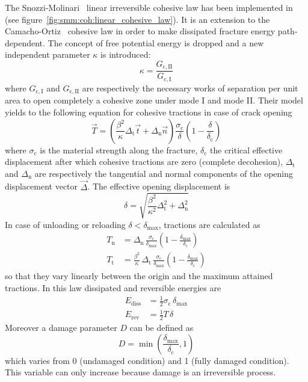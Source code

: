 The Snozzi-Molinari~\cite{snozzi_cohesive_2013} linear irreversible
cohesive law has been implemented in \akantu (see
figure~\ref{fig:smm:coh:linear_cohesive_law}). It is an extension to
the Camacho-Ortiz~\cite{camacho_computational_1996} cohesive law in
order to make dissipated fracture energy path-dependent. The concept
of free potential energy is dropped and a new independent parameter
$\kappa$ is introduced:
\begin{equation}
  \kappa = \frac{G_\mathrm{c, II}}{G_\mathrm{c, I}}
\end{equation}
where $G_\mathrm{c, I}$ and $G_\mathrm{c, II}$ are respectively the
necessary works of separation per unit area to open completely a
cohesive zone under mode I and mode II. Their model yields to the
following equation for cohesive tractions in case of crack opening
\begin{equation}
  \label{eq:smm:coh:tractions}
  \vec{T} = \left( \frac{\beta^2}{\kappa} \Delta_\mathrm{t} \vec{t} +
    \Delta_\mathrm{n} \vec{n} \right)
  \frac{\sigma_\mathrm{c}}{\delta}
  \left( 1- \frac{\delta}{\delta_\mathrm{c}} \right)
\end{equation}
where $\sigma_\mathrm{c}$ is the material strength along the fracture,
$\delta_\mathrm{c}$ the critical effective displacement after which
cohesive tractions are zero (complete decohesion), $\Delta_\mathrm{t}$
and $\Delta_\mathrm{n}$ are respectively the tangential and normal
components of the opening displacement vector $\vec{\Delta}$. The
effective opening displacement is
\begin{equation}
  \delta = \sqrt{\frac{\beta^2}{\kappa^2} \Delta_\mathrm{t}^2 +
    \Delta_\mathrm{n}^2}
\end{equation}
In case of unloading or reloading $\delta < \delta_\mathrm{max}$,
tractions are calculated as
\begin{align}
  T_\mathrm{n} &= \Delta_\mathrm{n}\,
  \frac{\sigma_\mathrm{c}}{\delta_\mathrm{max}}
  \left( 1- \frac{\delta_\mathrm{max}}{\delta_\mathrm{c}} \right) \\
  T_\mathrm{t} &= \frac{\beta^2}{\kappa}\, \Delta_\mathrm{t}\,
  \frac{\sigma_\mathrm{c}}{\delta_\mathrm{max}}
  \left( 1- \frac{\delta_\mathrm{max}}{\delta_\mathrm{c}} \right)
\end{align}
so that they vary linearly between the origin and the maximum attained
tractions. In this law dissipated and reversible energies are
\begin{align}
  E_\mathrm{diss} &= \frac{1}{2} \sigma_\mathrm{c}\, \delta_\mathrm{max}\\[1ex]
  E_\mathrm{rev} &= \frac{1}{2} T\, \delta
\end{align}
Moreover a damage parameter $D$ can be defined as
\begin{equation}
  D = \min \left(
    \frac{\delta_\mathrm{max}}{\delta_\mathrm{c}},1 \right)
\end{equation} which varies from 0 (undamaged condition) and 1 (fully
damaged condition). This variable can only increase because damage is
an irreversible process.

